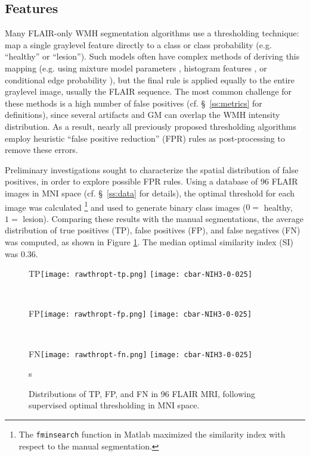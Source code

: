 \subsection{Features}
Many FLAIR-only WMH segmentation algorithms use a thresholding technique: map a single graylevel feature directly to a class or class probability (e.g. ``healthy'' or ``lesion'').
Such models often have complex methods of deriving this mapping (e.g. using mixture model parameters \cite{Roura2015}, histogram features \cite{Yoo2014}, or conditional edge probability \cite{Knight2016}), but the final rule is applied equally to the entire graylevel image, usually the FLAIR sequence.
The most common challenge for these methods is a high number of false positives (cf. \S\ \ref{ss:metrics} for definitions), since several artifacts and GM can overlap the WMH intensity distribution.
As a result, nearly all previously proposed thresholding algorithms employ heuristic ``false positive reduction'' (FPR) rules as post-processing to remove these errors.
\par
Preliminary investigations sought to characterize the spatial distribution of false positives, in order to explore possible FPR rules.
Using a database of 96 FLAIR images in MNI space (cf. \S\ \ref{ss:data} for details), the optimal threshold for each image was calculated%
\footnote{The \texttt{fminsearch} function in Matlab maximized the similarity index with respect to the manual segmentation.}
and used to generate binary class images ($0 =$ healthy, $1 =$ lesion).
Comparing these results with the manual segmentations, the average distribution of true positives (TP), false positives (FP), and false negatives (FN) was computed, as shown in Figure \ref{fig:thropt-tpfpfn}.
The median optimal similarity index (SI) was 0.36.
\begin{figure}[h]
  \centering
  \begin{subfigureside}{TP}\texttt{[image: rawthropt-tp.png]} \texttt{[image: cbar-NIH3-0-025]}\end{subfigureside}\\[0.5em]
  \begin{subfigureside}{FP}\texttt{[image: rawthropt-fp.png]} \texttt{[image: cbar-NIH3-0-025]}\end{subfigureside}\\[0.5em]
  \begin{subfigureside}{FN}\texttt{[image: rawthropt-fn.png]} \texttt{[image: cbar-NIH3-0-025]}\end{subfigureside}s
  \caption{Distributions of TP, FP, and FN in 96 FLAIR MRI, following supervised optimal thresholding in MNI space.}
  \label{fig:thropt-tpfpfn}
\end{figure}
